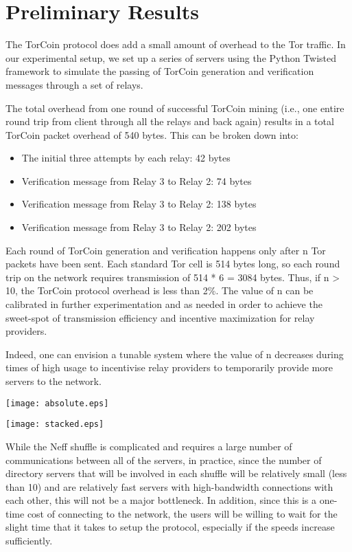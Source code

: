 \section{Preliminary Results}

The TorCoin protocol does add a small amount of overhead to the Tor traffic. In our experimental setup, we set up a series of servers using the Python Twisted framework to simulate the passing of TorCoin generation and verification messages through a set of relays. 

The total overhead from one round of successful TorCoin mining (i.e., one entire round trip from client through all the relays and back again) results in a total TorCoin packet overhead of 540 bytes. This can be broken down into: 
\begin{itemize}
\item The initial three attempts by each relay: 42 bytes
\item Verification message from Relay 3 to Relay 2: 74 bytes
\item Verification message from Relay 3 to Relay 2: 138 bytes
\item Verification message from Relay 3 to Relay 2: 202 bytes
\end{itemize}

Each round of TorCoin generation and verification happens only after n Tor packets have been sent. Each standard Tor cell is 514 bytes long, so each round trip on the network requires transmission of 514 * 6 = 3084 bytes. Thus, if n > 10, the TorCoin protocol overhead is less than 2\%. The value of n can be calibrated in further experimentation and as needed in order to achieve the sweet-spot of transmission efficiency and incentive maximization for relay providers.

Indeed, one can envision a tunable system where the value of n decreases during times of high usage to incentivise relay providers to temporarily provide more servers to the network.

\texttt{[image: absolute.eps]}

\texttt{[image: stacked.eps]}

While the Neff shuffle is complicated and requires a large number of communications between all of the servers, in practice, since the number of directory servers that will be involved in each shuffle will be relatively small (less than 10) and are relatively fast servers with high-bandwidth connections with each other, this will not be a major bottleneck. In addition, since this is a one-time cost of connecting to the network, the users will be willing to wait for the slight time that it takes to setup the protocol, especially if the speeds increase sufficiently.